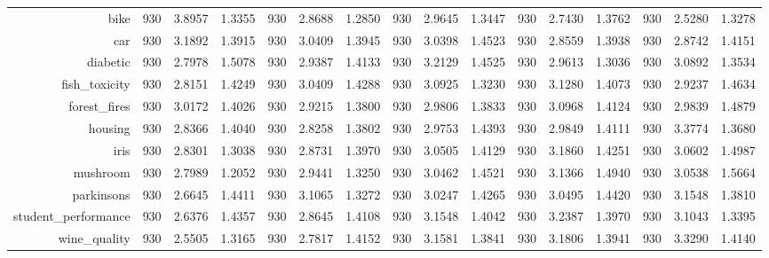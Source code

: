 \begin{table}[htbp]
{\begin{tabular}{rccccccccccccccc}
    bike  & 930   & 3.8957 & 1.3355 & 930   & 2.8688 & 1.2850 & 930   & 2.9645 & 1.3447 & 930   & 2.7430 & 1.3762 & 930   & \cellcolor[rgb]{ .776,  .937,  .808}\textcolor[rgb]{ 0,  .38,  0}{2.5280} & 1.3278 \\
    car   & 930   & 3.1892 & 1.3915 & 930   & 3.0409 & 1.3945 & 930   & 3.0398 & 1.4523 & 930   & \cellcolor[rgb]{ .776,  .937,  .808}\textcolor[rgb]{ 0,  .38,  0}{2.8559} & 1.3938 & 930   & 2.8742 & 1.4151 \\
    diabetic & 930   & \cellcolor[rgb]{ .776,  .937,  .808}\textcolor[rgb]{ 0,  .38,  0}{2.7978} & 1.5078 & 930   & 2.9387 & 1.4133 & 930   & 3.2129 & 1.4525 & 930   & 2.9613 & 1.3036 & 930   & 3.0892 & 1.3534 \\
    fish\_toxicity & 930   & \cellcolor[rgb]{ .776,  .937,  .808}\textcolor[rgb]{ 0,  .38,  0}{2.8151} & 1.4249 & 930   & 3.0409 & 1.4288 & 930   & 3.0925 & 1.3230 & 930   & 3.1280 & 1.4073 & 930   & 2.9237 & 1.4634 \\
    forest\_fires & 930   & 3.0172 & 1.4026 & 930   & \cellcolor[rgb]{ .776,  .937,  .808}\textcolor[rgb]{ 0,  .38,  0}{2.9215} & 1.3800 & 930   & 2.9806 & 1.3833 & 930   & 3.0968 & 1.4124 & 930   & 2.9839 & 1.4879 \\
    housing & 930   & 2.8366 & 1.4040 & 930   & \cellcolor[rgb]{ .776,  .937,  .808}\textcolor[rgb]{ 0,  .38,  0}{2.8258} & 1.3802 & 930   & 2.9753 & 1.4393 & 930   & 2.9849 & 1.4111 & 930   & 3.3774 & 1.3680 \\
    iris  & 930   & \cellcolor[rgb]{ .776,  .937,  .808}\textcolor[rgb]{ 0,  .38,  0}{2.8301} & 1.3038 & 930   & 2.8731 & 1.3970 & 930   & 3.0505 & 1.4129 & 930   & 3.1860 & 1.4251 & 930   & 3.0602 & 1.4987 \\
    mushroom & 930   & \cellcolor[rgb]{ .776,  .937,  .808}\textcolor[rgb]{ 0,  .38,  0}{2.7989} & 1.2052 & 930   & 2.9441 & 1.3250 & 930   & 3.0462 & 1.4521 & 930   & 3.1366 & 1.4940 & 930   & 3.0538 & 1.5664 \\
    parkinsons & 930   & \cellcolor[rgb]{ .776,  .937,  .808}\textcolor[rgb]{ 0,  .38,  0}{2.6645} & 1.4411 & 930   & 3.1065 & 1.3272 & 930   & 3.0247 & 1.4265 & 930   & 3.0495 & 1.4420 & 930   & 3.1548 & 1.3810 \\
    student\_performance & 930   & \cellcolor[rgb]{ .776,  .937,  .808}\textcolor[rgb]{ 0,  .38,  0}{2.6376} & 1.4357 & 930   & 2.8645 & 1.4108 & 930   & 3.1548 & 1.4042 & 930   & 3.2387 & 1.3970 & 930   & 3.1043 & 1.3395 \\
    wine\_quality & 930   & \cellcolor[rgb]{ .776,  .937,  .808}\textcolor[rgb]{ 0,  .38,  0}{2.5505} & 1.3165 & 930   & 2.7817 & 1.4152 & 930   & 3.1581 & 1.3841 & 930   & 3.1806 & 1.3941 & 930   & 3.3290 & 1.4140 \\

\end{tabular}}
\end{table}
